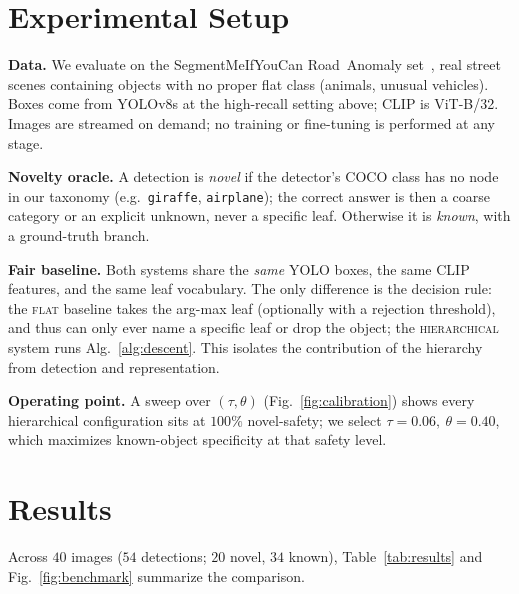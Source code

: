 \documentclass[conference]{IEEEtran}
\begin{document}
\section{Experimental Setup}
\label{sec:setup}

\textbf{Data.} We evaluate on the SegmentMeIfYouCan Road~Anomaly
set~\cite{chan2021}, real street scenes containing objects with no proper flat
class (animals, unusual vehicles). Boxes come from YOLOv8s at the high-recall
setting above; CLIP is ViT-B/32. Images are streamed on demand; no training or
fine-tuning is performed at any stage.

\textbf{Novelty oracle.} A detection is \emph{novel} if the detector's COCO class
has no node in our taxonomy (e.g.\ \texttt{giraffe}, \texttt{airplane}); the
correct answer is then a coarse category or an explicit unknown, never a specific
leaf. Otherwise it is \emph{known}, with a ground-truth branch.

\textbf{Fair baseline.} Both systems share the \emph{same} YOLO boxes, the same
CLIP features, and the same leaf vocabulary. The only difference is the decision
rule: the \textsc{flat} baseline takes the arg-max leaf (optionally with a
rejection threshold), and thus can only ever name a specific leaf or drop the
object; the \textsc{hierarchical} system runs Alg.~\ref{alg:descent}. This
isolates the contribution of the hierarchy from detection and representation.

\textbf{Operating point.} A sweep over $(\tau,\theta)$
(Fig.~\ref{fig:calibration}) shows every hierarchical configuration sits at
$100\%$ novel-safety; we select $\tau{=}0.06,\ \theta{=}0.40$, which maximizes
known-object specificity at that safety level.

\section{Results}
\label{sec:results}

Across $40$ images ($54$ detections; $20$ novel, $34$ known),
Table~\ref{tab:results} and Fig.~\ref{fig:benchmark} summarize the comparison.
\end{document}
